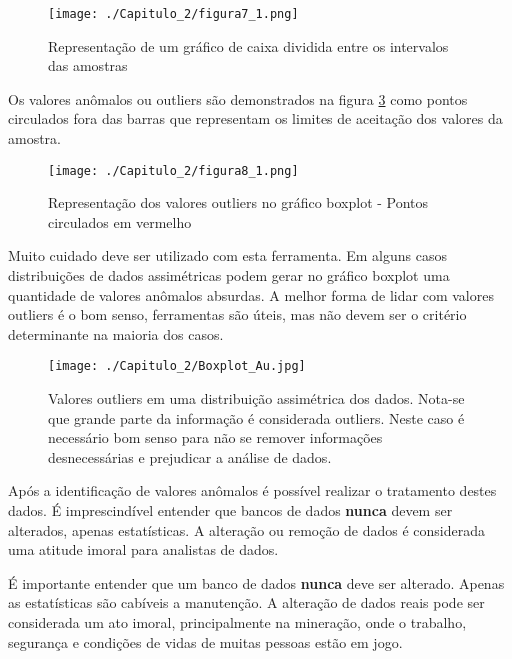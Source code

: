 \FloatBarrier
\begin{figure}[!htb]
\centering
\texttt{[image: ./Capitulo\_2/figura7\_1.png]}	
\caption{Representação de um gráfico de caixa dividida entre os intervalos das amostras }
\label{fig7_1}
\end{figure}
\FloatBarrier


Os valores anômalos ou outliers são demonstrados na figura \ref{Fig8_1} como pontos circulados fora das barras que representam os limites de aceitação dos valores da amostra.

\FloatBarrier
\begin{figure}[!htb]
	\centering
	\texttt{[image: ./Capitulo\_2/figura8\_1.png]}	
	\caption{Representação dos valores outliers no gráfico boxplot - Pontos circulados em vermelho }
	\label{Fig8_1}
\end{figure}
\FloatBarrier

Muito cuidado deve ser utilizado com esta ferramenta. Em alguns casos distribuições de dados assimétricas podem gerar no gráfico boxplot uma quantidade de valores anômalos absurdas. A melhor forma de lidar com valores outliers é o bom senso, ferramentas são úteis, mas não devem ser o critério determinante na maioria dos casos.

\FloatBarrier
\begin{figure}[!htb]
	\centering
	\texttt{[image: ./Capitulo\_2/Boxplot\_Au.jpg]}	
	\caption{Valores outliers em uma distribuição assimétrica dos dados. Nota-se que grande parte da informação é considerada outliers. Neste caso é necessário bom senso para não se remover informações desnecessárias e prejudicar a análise de dados. }
	\label{Fig8_1}
\end{figure}
\FloatBarrier

Após a identificação de valores anômalos é possível realizar o tratamento destes dados. É imprescindível entender que bancos de dados \textbf{nunca} devem ser alterados, apenas estatísticas. A alteração ou remoção de dados é considerada uma atitude imoral para analistas de dados. 

\begin{remark}
	É importante entender que um banco de dados \textbf{nunca} deve ser alterado. Apenas as estatísticas são cabíveis a manutenção. A alteração de dados reais pode ser considerada um ato imoral, principalmente na mineração, onde o trabalho, segurança e condições de vidas de muitas pessoas estão em jogo. 
\end{remark}

